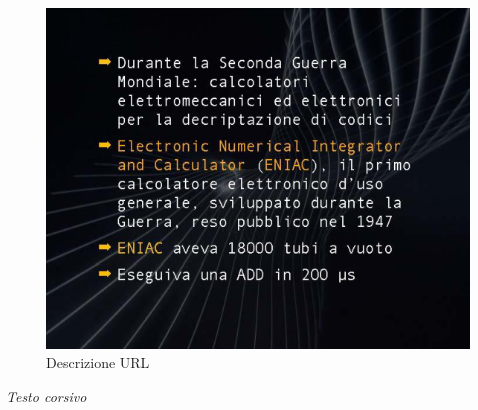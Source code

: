 \begin{figure}[ht]
    \centering
    \includegraphics[width=0.9\linewidth]{images/Lez01_p01_fig_04.png}
    \caption{Descrizione URL}
    \label{fig:descrizione_URL}
\end{figure}

\textit{Testo corsivo}